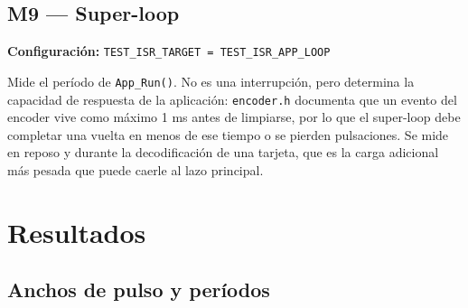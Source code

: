 \documentclass[11pt,a4paper]{article}
\begin{document}
\subsection{M9 --- Super-loop}
\textbf{Configuración:} \texttt{TEST\_ISR\_TARGET = TEST\_ISR\_APP\_LOOP}

Mide el período de \texttt{App\_Run()}. No es una interrupción, pero
determina la capacidad de respuesta de la aplicación: \texttt{encoder.h}
documenta que un evento del encoder vive como máximo 1 ms antes de
limpiarse, por lo que el super-loop debe completar una vuelta en menos de
ese tiempo o se pierden pulsaciones. Se mide en reposo y durante la
decodificación de una tarjeta, que es la carga adicional más pesada que
puede caerle al lazo principal.

\newpage
\section{Resultados}

\subsection{Anchos de pulso y períodos}
\end{document}
